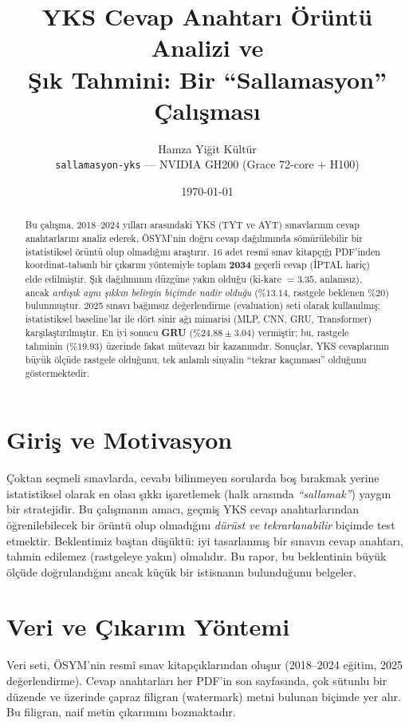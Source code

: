 \documentclass[11pt]{article}
\title{\textbf{YKS Cevap Anahtarı Örüntü Analizi ve\\
Şık Tahmini: Bir ``Sallamasyon'' Çalışması}}
\author{Hamza Yiğit Kültür\\[2pt]
\small \texttt{sallamasyon-yks} --- NVIDIA GH200 (Grace 72-core + H100)}
\date{\today}
\begin{document}
\maketitle

\begin{abstract}
\noindent
Bu çalışma, 2018--2024 yılları arasındaki YKS (TYT ve AYT) sınavlarının
cevap anahtarlarını analiz ederek, ÖSYM'nin doğru cevap dağılımında
sömürülebilir bir istatistiksel örüntü olup olmadığını araştırır. 16 adet
resmî sınav kitapçığı PDF'inden koordinat-tabanlı bir çıkarım yöntemiyle
toplam \textbf{2034} geçerli cevap (İPTAL hariç) elde edilmiştir. Şık
dağılımının düzgüne yakın olduğu (ki-kare $=3.35$, anlamsız), ancak
\emph{ardışık aynı şıkkın belirgin biçimde nadir olduğu} ($\%13.14$, rastgele
beklenen $\%20$) bulunmuştur. 2025 sınavı bağımsız değerlendirme (evaluation)
seti olarak kullanılmış; istatistiksel baseline'lar ile dört sinir ağı
mimarisi (MLP, CNN, GRU, Transformer) karşılaştırılmıştır. En iyi sonucu
\textbf{GRU} ($\%24.88 \pm 3.04$) vermiştir; bu, rastgele tahminin
($\%19.93$) üzerinde fakat mütevazı bir kazanımdır. Sonuçlar, YKS
cevaplarının büyük ölçüde rastgele olduğunu, tek anlamlı sinyalin
``tekrar kaçınması'' olduğunu göstermektedir.
\end{abstract}

\section{Giriş ve Motivasyon}
Çoktan seçmeli sınavlarda, cevabı bilinmeyen sorularda boş bırakmak yerine
istatistiksel olarak en olası şıkkı işaretlemek (halk arasında
\emph{``sallamak''}) yaygın bir stratejidir. Bu çalışmanın amacı, geçmiş YKS
cevap anahtarlarından öğrenilebilecek bir örüntü olup olmadığını
\emph{dürüst ve tekrarlanabilir} biçimde test etmektir. Beklentimiz
baştan düşüktü: iyi tasarlanmış bir sınavın cevap anahtarı, tahmin
edilemez (rastgeleye yakın) olmalıdır. Bu rapor, bu beklentinin büyük
ölçüde doğrulandığını ancak küçük bir istisnanın bulunduğunu belgeler.

\section{Veri ve Çıkarım Yöntemi}
Veri seti, ÖSYM'nin resmî sınav kitapçıklarından oluşur (2018--2024 eğitim,
2025 değerlendirme). Cevap anahtarları her PDF'in son sayfasında, çok
sütunlu bir düzende ve üzerinde çapraz filigran (watermark) metni bulunan
biçimde yer alır. Bu filigran, naif metin çıkarımını bozmaktadır.
\end{document}
